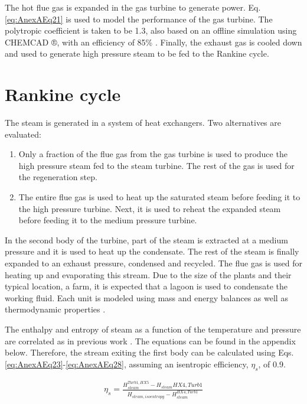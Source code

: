 \begin{refsection}[referencesCh2]
The hot flue gas is expanded in the gas turbine to generate power. Eq. \ref{eq:AnexAEq21} is used to model the performance of the gas turbine. The polytropic coefficient is taken to be 1.3, also based on an offline simulation using CHEMCAD ®, with an efficiency of 85\% \citep{Moran2003}. Finally, the exhaust gas is cooled down and used to generate high pressure steam to be fed to the Rankine cycle.

\section{Rankine cycle}
The steam is generated in a system of heat exchangers. Two alternatives are evaluated: 
\begin{enumerate}
	\item Only a fraction of the flue gas from the gas turbine is used to produce the high pressure steam fed to the steam turbine. The rest of the gas is used for the regeneration step.
	\item The entire flue gas is used to heat up the saturated steam before feeding it to the high pressure turbine. Next, it is used to reheat the expanded steam before feeding it to the medium pressure turbine.
\end{enumerate}

In the second body of the turbine, part of the steam is extracted at a medium pressure and it is used to heat up the condensate. The rest of the steam is finally expanded to an exhaust pressure, condensed and recycled. The flue gas is used for heating up and evaporating this stream. Due to the size of the plants and their typical location, a farm, it is expected that a lagoon is used to condensate the working fluid. Each unit is modeled using mass and energy balances as well as thermodynamic properties \citep{martin2013optimal, vidal2015optimal}.

The enthalpy and entropy of steam as a function of the temperature and pressure are correlated as in previous work \citep{martin2013optimal, vidal2015optimal}. The equations can be found in the appendix below. Therefore, the stream exiting the first body can be calculated using Eqs. \ref{eq:AnexAEq23}-\ref{eq:AnexAEq28}, assuming an isentropic efficiency, $\eta_s$, of 0.9.

\begin{align}
	{\eta _s} = \frac{{{{{H}}_{{{steam }}}^{{{Turb1}},{{HX5}}}} - {{{H}}_{{{steam}}}{{{HX4}},{{Turb1}}}}}}{{{{{H}}_{steam , isoentropy}}{{ - }}{{{H}}_{{{steam}}}^{{{HX4}},{{Turb1}}}}}} \label{eq:AnexAEq23}
\end{align}


\end{refsection}
